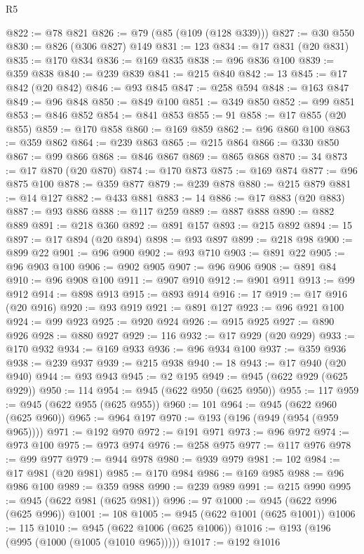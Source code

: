 \begin{lexlean}{R5}
\begin{coremodule}
@822 := @78 @821
@826 := @79 (@85 (@109 (@128 @339)))
@827 := @30 @550
@830 := @826 (@306 @827) @149
@831 := 123
@834 := @17 @831 (@20 @831)
@835 := @170 @834
@836 := @169 @835
@838 := @96 @836 @100
@839 := @359 @838
@840 := @239 @839
@841 := @215 @840
@842 := 13
@845 := @17 @842 (@20 @842)
@846 := @93 @845
@847 := @258 @594
@848 := @163 @847
@849 := @96 @848
@850 := @849 @100
@851 := @349 @850
@852 := @99 @851
@853 := @846 @852
@854 := @841 @853
@855 := 91
@858 := @17 @855 (@20 @855)
@859 := @170 @858
@860 := @169 @859
@862 := @96 @860 @100
@863 := @359 @862
@864 := @239 @863
@865 := @215 @864
@866 := @330 @850
@867 := @99 @866
@868 := @846 @867
@869 := @865 @868
@870 := 34
@873 := @17 @870 (@20 @870)
@874 := @170 @873
@875 := @169 @874
@877 := @96 @875 @100
@878 := @359 @877
@879 := @239 @878
@880 := @215 @879
@881 := @14 @127
@882 := @433 @881
@883 := 14
@886 := @17 @883 (@20 @883)
@887 := @93 @886
@888 := @117 @259
@889 := @887 @888
@890 := @882 @889
@891 := @218 @360
@892 := @891 @157
@893 := @215 @892
@894 := 15
@897 := @17 @894 (@20 @894)
@898 := @93 @897
@899 := @218 @98
@900 := @899 @22
@901 := @96 @900
@902 := @93 @710
@903 := @891 @22
@905 := @96 @903 @100
@906 := @902 @905
@907 := @96 @906
@908 := @891 @84
@910 := @96 @908 @100
@911 := @907 @910
@912 := @901 @911
@913 := @99 @912
@914 := @898 @913
@915 := @893 @914
@916 := 17
@919 := @17 @916 (@20 @916)
@920 := @93 @919
@921 := @891 @127
@923 := @96 @921 @100
@924 := @99 @923
@925 := @920 @924
@926 := @915 @925
@927 := @890 @926
@928 := @880 @927
@929 := 116
@932 := @17 @929 (@20 @929)
@933 := @170 @932
@934 := @169 @933
@936 := @96 @934 @100
@937 := @359 @936
@938 := @239 @937
@939 := @215 @938
@940 := 18
@943 := @17 @940 (@20 @940)
@944 := @93 @943
@945 := @2 @195
@949 := @945 (@622 @929 (@625 @929))
@950 := 114
@954 := @945 (@622 @950 (@625 @950))
@955 := 117
@959 := @945 (@622 @955 (@625 @955))
@960 := 101
@964 := @945 (@622 @960 (@625 @960))
@965 := @964 @197
@970 := @193 (@196 (@949 (@954 (@959 @965))))
@971 := @192 @970
@972 := @191 @971
@973 := @96 @972
@974 := @973 @100
@975 := @973 @974
@976 := @258 @975
@977 := @117 @976
@978 := @99 @977
@979 := @944 @978
@980 := @939 @979
@981 := 102
@984 := @17 @981 (@20 @981)
@985 := @170 @984
@986 := @169 @985
@988 := @96 @986 @100
@989 := @359 @988
@990 := @239 @989
@991 := @215 @990
@995 := @945 (@622 @981 (@625 @981))
@996 := 97
@1000 := @945 (@622 @996 (@625 @996))
@1001 := 108
@1005 := @945 (@622 @1001 (@625 @1001))
@1006 := 115
@1010 := @945 (@622 @1006 (@625 @1006))
@1016 := @193 (@196 (@995 (@1000 (@1005 (@1010 @965)))))
@1017 := @192 @1016

\end{coremodule}
\end{lexlean}
